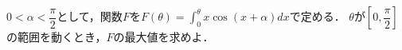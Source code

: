 \documentclass[../../main.tex]{subfiles}
\begin{document}
$\displaystyle 0<\alpha<\dfrac{\pi}{2}$として，関数$F$を$\displaystyle F(\theta)=\int_0^{\theta}x\cos(x+\alpha)dx$で定める．
$\theta$が$\displaystyle\left[0,\dfrac{\pi}{2}\right]$の範囲を動くとき，$F$の最大値を求めよ．
\end{document}
